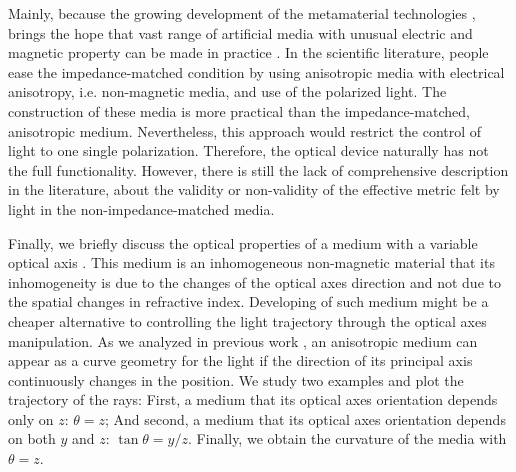 \documentclass[9pt,twocolumn,twoside]{osajnl}
\begin{document}
Mainly, because the growing development of the metamaterial technologies \cite{cai2010optical}, brings the hope that vast range of artificial media with unusual electric and magnetic property can be made in practice \cite{cai2010optical, narimanov2009optical}.
 In the scientific literature, people ease the impedance-matched condition by using anisotropic media with electrical anisotropy, i.e. non-magnetic media, and use of the polarized light. The construction of these media is more practical than the impedance-matched, anisotropic medium. Nevertheless, this approach would restrict the control of light to one single polarization. Therefore, the optical device naturally has not the full functionality. 
However, there is still the lack of comprehensive description in the literature, about the validity or non-validity of the effective metric felt by light in the non-impedance-matched media.

 Finally, we briefly discuss the optical properties of a medium with a variable optical axis \cite{liang2012transformation}. This medium is an inhomogeneous non-magnetic material that its inhomogeneity is due to the changes of the optical axes direction and not due to the spatial changes in refractive index.  Developing of such medium might be a cheaper alternative to controlling the light trajectory through the optical axes manipulation.
  As we analyzed in previous work \cite{},  an anisotropic medium can appear as a curve geometry for the light if the direction of its principal axis continuously changes in the position. 
We study two examples and plot the trajectory of the rays: First, a medium that its optical axes orientation depends only on  $z$: $\theta=z$;  And second, a medium that its optical axes orientation depends on both $y$ and $z$: $\tan{\theta}=y/z$.  Finally, we obtain the curvature of the media with $\theta=z$.
   
\end{document}
